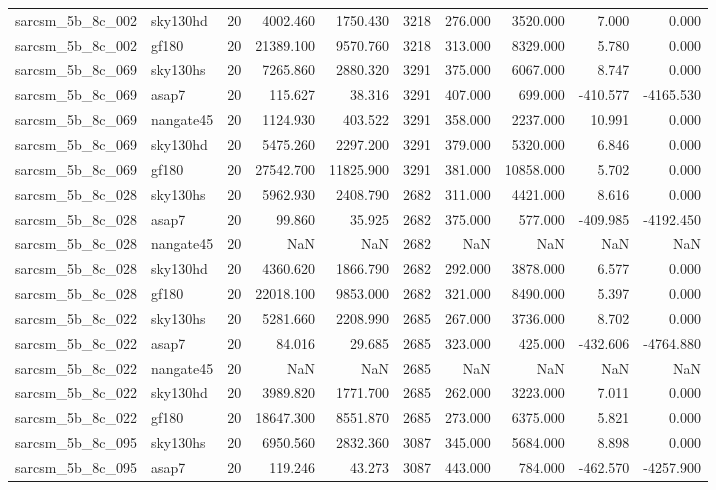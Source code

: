 \documentclass{article}
\begin{document}
\begin{longtable}{llrrrrrrrr}
sarcsm\_5b\_8c\_002 & sky130hd & 20 & 4002.460 & 1750.430 & 3218 & 276.000 & 3520.000 & 7.000 & 0.000 \\
sarcsm\_5b\_8c\_002 & gf180 & 20 & 21389.100 & 9570.760 & 3218 & 313.000 & 8329.000 & 5.780 & 0.000 \\
sarcsm\_5b\_8c\_069 & sky130hs & 20 & 7265.860 & 2880.320 & 3291 & 375.000 & 6067.000 & 8.747 & 0.000 \\
sarcsm\_5b\_8c\_069 & asap7 & 20 & 115.627 & 38.316 & 3291 & 407.000 & 699.000 & -410.577 & -4165.530 \\
sarcsm\_5b\_8c\_069 & nangate45 & 20 & 1124.930 & 403.522 & 3291 & 358.000 & 2237.000 & 10.991 & 0.000 \\
sarcsm\_5b\_8c\_069 & sky130hd & 20 & 5475.260 & 2297.200 & 3291 & 379.000 & 5320.000 & 6.846 & 0.000 \\
sarcsm\_5b\_8c\_069 & gf180 & 20 & 27542.700 & 11825.900 & 3291 & 381.000 & 10858.000 & 5.702 & 0.000 \\
sarcsm\_5b\_8c\_028 & sky130hs & 20 & 5962.930 & 2408.790 & 2682 & 311.000 & 4421.000 & 8.616 & 0.000 \\
sarcsm\_5b\_8c\_028 & asap7 & 20 & 99.860 & 35.925 & 2682 & 375.000 & 577.000 & -409.985 & -4192.450 \\
sarcsm\_5b\_8c\_028 & nangate45 & 20 & NaN & NaN & 2682 & NaN & NaN & NaN & NaN \\
sarcsm\_5b\_8c\_028 & sky130hd & 20 & 4360.620 & 1866.790 & 2682 & 292.000 & 3878.000 & 6.577 & 0.000 \\
sarcsm\_5b\_8c\_028 & gf180 & 20 & 22018.100 & 9853.000 & 2682 & 321.000 & 8490.000 & 5.397 & 0.000 \\
sarcsm\_5b\_8c\_022 & sky130hs & 20 & 5281.660 & 2208.990 & 2685 & 267.000 & 3736.000 & 8.702 & 0.000 \\
sarcsm\_5b\_8c\_022 & asap7 & 20 & 84.016 & 29.685 & 2685 & 323.000 & 425.000 & -432.606 & -4764.880 \\
sarcsm\_5b\_8c\_022 & nangate45 & 20 & NaN & NaN & 2685 & NaN & NaN & NaN & NaN \\
sarcsm\_5b\_8c\_022 & sky130hd & 20 & 3989.820 & 1771.700 & 2685 & 262.000 & 3223.000 & 7.011 & 0.000 \\
sarcsm\_5b\_8c\_022 & gf180 & 20 & 18647.300 & 8551.870 & 2685 & 273.000 & 6375.000 & 5.821 & 0.000 \\
sarcsm\_5b\_8c\_095 & sky130hs & 20 & 6950.560 & 2832.360 & 3087 & 345.000 & 5684.000 & 8.898 & 0.000 \\
sarcsm\_5b\_8c\_095 & asap7 & 20 & 119.246 & 43.273 & 3087 & 443.000 & 784.000 & -462.570 & -4257.900 \\

\end{longtable}
\end{document}
